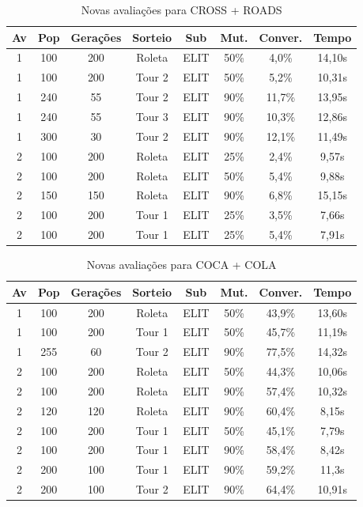\documentclass[a4paper, 12pt]{article}
\begin{document}
  \begin{table}[h]
    \centering
    \begin{tabular}{|c|c|c|c|c|c|c|c|}
      \hline
      Av & Pop & Gerações & Sorteio & Sub & Mut. & Conver. & Tempo  \\
      \hline
      1 & 100 & 200 & Roleta & ELIT & 50\% &4,0\% & 14,10s \\
      \hline
      1 & 100 & 200 & Tour 2 & ELIT & 50\% &5,2\% & 10,31s \\
      \hline
      1 & 240 & 55 & Tour 2 & ELIT & 90\% &11,7\% & 13,95s \\
      \hline
      1 & 240 & 55 & Tour 3 & ELIT & 90\% &10,3\% & 12,86s \\
      \hline
      1 & 300 & 30 & Tour 2 & ELIT & 90\% &12,1\% & 11,49s \\
      \hline
      2 & 100 & 200 & Roleta & ELIT & 25\% &2,4\% & 9,57s \\
      \hline
      2 & 100 & 200 & Roleta & ELIT & 50\% &5,4\% & 9,88s \\
      \hline
      2 & 150 & 150 & Roleta & ELIT & 90\% &6,8\% & 15,15s \\
      \hline
      2 & 100 & 200 & Tour 1 & ELIT & 25\% &3,5\% & 7,66s \\
      \hline
      2 & 100 & 200 & Tour 1 & ELIT & 25\% &5,4\% & 7,91s \\
      \hline
    \end{tabular}
    \caption{Novas avaliações para CROSS + ROADS}
    \label{tab:cross}
  \end{table}

  \begin{table}[h]
    \centering
    \begin{tabular}{|c|c|c|c|c|c|c|c|}
      \hline
      Av & Pop & Gerações & Sorteio & Sub & Mut. & Conver. & Tempo  \\
      \hline
      1 & 100 & 200 & Roleta & ELIT & 50\% &43,9\% & 13,60s\\
      \hline
      1& 100 & 200 & Tour 1 & ELIT & 50\% &45,7\% & 11,19s\\
      \hline
      1& 255 & 60 & Tour 2 & ELIT & 90\% &77,5\% & 14,32s\\
      \hline
      2& 100 & 200 & Roleta & ELIT & 50\% &44,3\% & 10,06s\\
      \hline
      2& 100 & 200 & Roleta & ELIT & 90\% &57,4\% & 10,32s\\
      \hline
      2& 120 & 120 & Roleta & ELIT & 90\% &60,4\% & 8,15s\\
      \hline
      2& 100 & 200 & Tour 1 & ELIT & 50\% &45,1\% & 7,79s\\
      \hline
      2& 100 & 200 & Tour 1 & ELIT & 90\% &58,4\% & 8,42s\\
      \hline
      2& 200 & 100 & Tour 1 & ELIT & 90\% &59,2\% & 11,3s\\
      \hline
      2& 200 & 100 & Tour 2 & ELIT & 90\% &64,4\% & 10,91s\\
      \hline
    \end{tabular}
    \caption{Novas avaliações para COCA + COLA}
    \label{tab:coca}
  \end{table}
\end{document}
